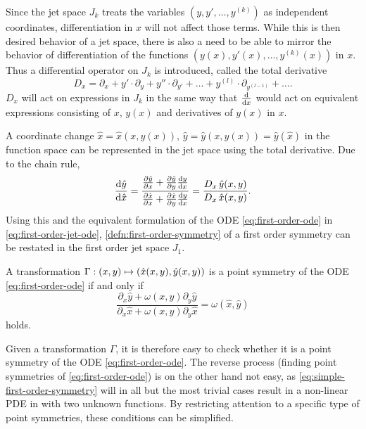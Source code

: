 Since the jet space \(J_k\) treats the variables \((y, y', \dots, y^{(k)})\) as independent coordinates, differentiation in \(x\) will not affect those terms.
While this is then desired behavior of a jet space, there is also a need to be able to mirror the behavior of differentiation of the functions \((y(x), y'(x), \dots, y^{(k)}(x))\) in \(x\).
Thus a differential operator on \(J_k\) is introduced, called the total derivative
\begin{equation}
  D_x = \partial_x + y' \cdot \partial_y + y'' \cdot \partial_{y'} + \dots + y^{(l)} \cdot \partial_{y^{(l-1)}} + \dots .
\end{equation}
\(D_x\) will act on expressions in \(J_k\) in the same way that \(\dv{x}\) would act on equivalent expressions consisting of \(x\), \(y(x)\) and derivatives of \(y(x)\) in \(x\).

A coordinate change \(\hat{x} = \hat{x}(x, y(x)),\, \hat{y} = \hat{y}(x, y(x)) = \hat{y}(\hat{x})\) in the function space can be represented in the jet space using the total derivative.
Due to the chain rule,
\begin{equation}
  \dv{\hat{y}}{\hat{x}} = 
  \frac{\pdv{\hat{y}}{x} + \pdv{\hat{y}}{y} \dv{y}{x}}{\pdv{\hat{x}}{x} + \pdv{\hat{x}}{y} \dv{y}{x}} =
  \frac{D_{x}\, \hat{y}(x,y)}{D_{x}\, \hat{x}(x,y)}.
\end{equation}
Using this and the equivalent formulation of the ODE \ref{eq:first-order-ode} in \cref{eq:first-order-jet-ode}, \cref{defn:first-order-symmetry} of a first order symmetry can be restated in the first order jet space \(J_1\).
\begin{lem} \label{lem:simple-first-order-symmetry}
  A transformation \(\Gamma: \pqty{x,y} \mapsto \pqty{\hat{x}(x,y), \hat{y}(x,y)}\) is a point symmetry of the ODE \ref{eq:first-order-ode} if and only if
  \begin{equation} \label{eq:simple-first-order-symmetry}
    \frac{\partial_x \hat{y} + \omega(x,y) \partial_y \hat{y}}{\partial_x \hat{x} + \omega(x,y) \partial_y \hat{x}} = \omega(\hat{x},\hat{y})
  \end{equation}
  holds.
\end{lem} %
Given a transformation \(\Gamma\), it is therefore easy to check whether it is a point symmetry of the ODE \ref{eq:first-order-ode}.
The reverse process (finding point symmetries of \cref{eq:first-order-ode}) is on the other hand not easy, as \cref{eq:simple-first-order-symmetry} will in all but the most trivial cases result in a non-linear PDE in with two unknown functions.
By restricting attention to a specific type of point symmetries, these conditions can be simplified.

